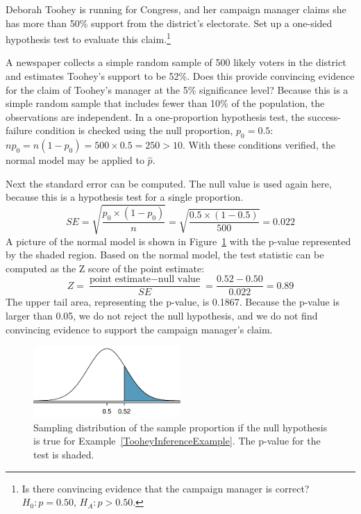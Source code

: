 
\begin{exercise}
Deborah Toohey is running for Congress, and her campaign manager claims she has more than 50\% support from the district's electorate. Set up a one-sided hypothesis test to evaluate this claim.\footnote{Is there convincing evidence that the campaign manager is correct? $H_0: p = 0.50$, $H_A: p > 0.50$.}
\end{exercise}

\begin{example}{A newspaper collects a simple random sample of 500 likely voters in the district and estimates Toohey's support to be 52\%. Does this provide convincing evidence for the claim of Toohey's manager at the 5\% significance level?} \label{TooheyInferenceExample}
Because this is a simple random sample that includes fewer than 10\% of the population, the observations are independent. In a one-proportion hypothesis test, the success-failure condition is checked using the null proportion, $p_0=0.5$: $np_0 = n(1-p_0) = 500\times 0.5 = 250 > 10$. With these conditions verified, the normal model may be applied to $\hat{p}$.

Next the standard error can be computed. The null value is used again here, because this is a hypothesis test for a single proportion.
$$SE = \sqrt{\frac{p_0\times (1-p_0)}{n}} = \sqrt{\frac{0.5\times (1-0.5)}{500}} = 0.022$$
A picture of the normal model is shown in Figure~\ref{pValueForCampaignManagerClaimOfMoreThan50PercentSupport} with the p-value represented by the shaded region. Based on the normal model, the test statistic can be computed as the Z score of the point estimate:
$$Z = \frac{\text{point estimate} - \text{null value}}{SE} = \frac{0.52 - 0.50}{0.022} = 0.89$$
The upper tail area, representing the p-value, is 0.1867. Because the p-value is larger than 0.05, we do not reject the null hypothesis, and we do not find convincing evidence to support the campaign manager's claim.
\end{example}

\begin{figure}[h]
\centering
\includegraphics[width=0.5\textwidth]{ch_inference_for_props/figures/pValueForCampaignManagerClaimOfMoreThan50PercentSupport/pValueForCampaignManagerClaimOfMoreThan50PercentSupport}
\caption{Sampling distribution of the sample proportion if the null hypothesis is true for Example~\ref{TooheyInferenceExample}. The p-value for the test is shaded.}
\label{pValueForCampaignManagerClaimOfMoreThan50PercentSupport}
\end{figure}

